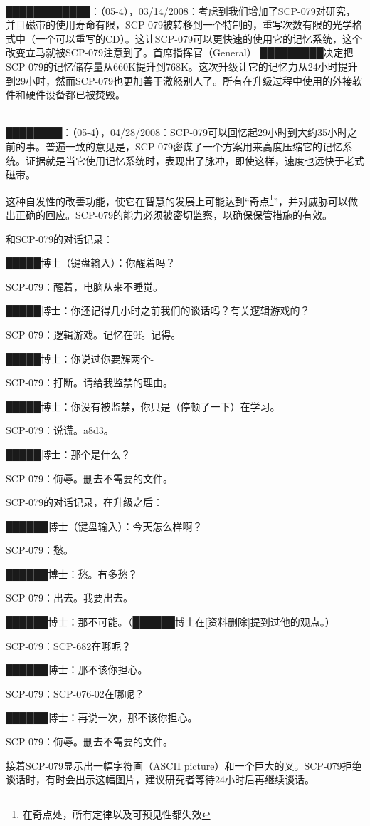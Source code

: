 \\
████████████：（05-4），03\slash 14\slash 2008：考虑到我们增加了SCP-079对研究，并且磁带的使用寿命有限，SCP-079被转移到一个特制的，重写次数有限的光学格式中（一个可以重写的CD）。这让SCP-079可以更快速的使用它的记忆系统，这个改变立马就被SCP-079注意到了。首席指挥官（General） █████████决定把SCP-079的记忆储存量从660K提升到768K。这次升级让它的记忆力从24小时提升到29小时，然而SCP-079也更加善于激怒别人了。所有在升级过程中使用的外接软件和硬件设备都已被焚毁。

\\
████████：（05-4），04\slash 28\slash 2008：SCP-079可以回忆起29小时到大约35小时之前的事。普遍一致的意见是，SCP-079密谋了一个方案用来高度压缩它的记忆系统。证据就是当它使用记忆系统时，表现出了脉冲，即使这样，速度也远快于老式磁带。

这种自发性的改善功能，使它在智慧的发展上可能达到“奇点\footnote{在奇点处，所有定律以及可预见性都失效}”，并对威胁可以做出正确的回应。SCP-079的能力必须被密切监察，以确保保管措施的有效。

和SCP-079的对话记录：

\begin{scpbox}

█████博士（键盘输入）：你醒着吗？

SCP-079：醒着，电脑从来不睡觉。

█████博士：你还记得几小时之前我们的谈话吗？有关逻辑游戏的？

SCP-079：逻辑游戏。记忆在9f。记得。

█████博士：你说过你要解两个-

SCP-079：打断。请给我监禁的理由。

█████博士：你没有被监禁，你只是（停顿了一下）在学习。

SCP-079：说谎。a8d3。

█████博士：那个是什么？

SCP-079：侮辱。删去不需要的文件。

\end{scpbox}

 SCP-079的对话记录，在升级之后：

\begin{scpbox}

██████博士（键盘输入）：今天怎么样啊？

SCP-079：愁。

██████博士：愁。有多愁？

SCP-079：出去。我要出去。

██████博士：那不可能。（██████博士在{[}资料删除]提到过他的观点。）

SCP-079：SCP-682在哪呢？

██████博士：那不该你担心。

SCP-079：SCP-076-02在哪呢？

██████博士：再说一次，那不该你担心。

SCP-079：侮辱。删去不需要的文件。

\end{scpbox}

接着SCP-079显示出一幅字符画（ASCII picture）和一个巨大的叉。SCP-079拒绝谈话时，有时会出示这幅图片，建议研究者等待24小时后再继续谈话。
